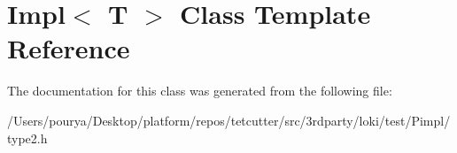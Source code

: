 \hypertarget{classImpl}{}\section{Impl$<$ T $>$ Class Template Reference}
\label{classImpl}


The documentation for this class was generated from the following file\+:\begin{DoxyCompactItemize}
\item 
/\+Users/pourya/\+Desktop/platform/repos/tetcutter/src/3rdparty/loki/test/\+Pimpl/type2.\+h\end{DoxyCompactItemize}
